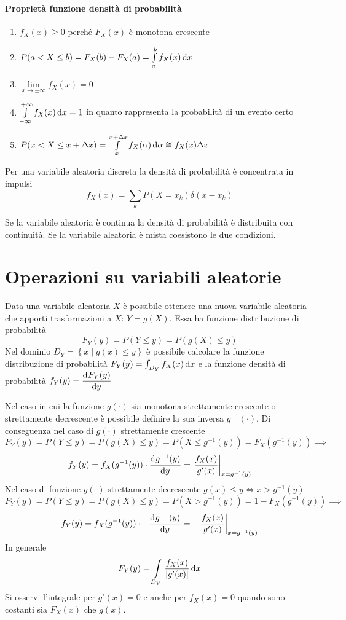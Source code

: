 \paragraph{Proprietà funzione densità di probabilità}
\begin{enumerate}
\item $f_X(x)\geq 0$ perché $F_X(x)$ è monotona crescente
\item $P(a<X\leq b)=F_X(b)-F_X(a)=\int\limits_{a}^{b}{f_X(x)}{\,\mathop{}\!\mathrm{d}{x}}$
\item $\lim\limits_{x\to\pm\infty}f_X(x)=0$
\item $\int\limits_{-\infty}^{+\infty}{f_X(x)}{\,\mathop{}\!\mathrm{d}{x}}=1$ in quanto rappresenta la probabilità di un evento certo
\item $P(x<X\leq x+\Delta x)=\int\limits_{x}^{x+\Delta x}{f_X(\alpha)}{\,\mathop{}\!\mathrm{d}{\alpha}}\cong f_X(x)\Delta x$
\end{enumerate}

Per una variabile aleatoria discreta la densità di probabilità è concentrata in impulsi
\begin{equation}
	f_X(x)=\sum_k P(X=x_k) \delta(x-x_k)
\end{equation}

Se la variabile aleatoria è continua la densità di probabilità è distribuita con continuità.
Se la variabile aleatoria è mista coesistono le due condizioni.

\section{Operazioni su variabili aleatorie}
Data una variabile aleatoria $X$ è possibile ottenere una nuova variabile aleatoria che apporti trasformazioni a $X$: $Y=g(X)$. Essa ha funzione distribuzione di probabilità
\begin{equation}
	F_Y(y)=P(Y\leq y)=P(g(X)\leq y)
\end{equation}
Nel dominio $D_Y=\left\lbrace x\mid g(x)\leq y\right\rbrace$ è possibile calcolare la funzione distribuzione di probabilità $F_Y(y)=\int_{D_Y}{f_X(x)\mathop{}\!\mathrm{d} x}$ e la funzione densità di probabilità $f_Y(y)=\dfrac{\mathop{}\!\mathrm{d}^{}F_Y(y)}{\mathop{}\!\mathrm{d} y^{}}$

Nel caso in cui la funzione $g(\cdot)$ sia monotona strettamente crescente o strettamente decrescente è possibile definire la sua inversa $g^{-1}(\cdot)$. Di conseguenza nel caso di $g(\cdot)$ strettamente crescente
\[
	F_Y(y)=P(Y\leq y)=P(g(X)\leq y)=P(X\leq g^{-1}(y))=F_X(g^{-1}(y))\implies
\]
\begin{equation}
	f_Y(y)=f_X(g^{-1}(y))\cdot\dfrac{\mathop{}\!\mathrm{d}^{}g^{-1}(y)}{\mathop{}\!\mathrm{d} y^{}}=\left.{\frac{f_X(x)}{g'(x)}}\right\rvert_{x=g^{-1}(y)}
\end{equation}
Nel caso di funzione $g(\cdot)$ strettamente decrescente $g(x)\leq y\iff x>g^{-1}(y)$
\[F_Y(y)=P(Y\leq y)=P(g(X)\leq y)=P(X>g^{-1}(y))=1-F_X(g^{-1}(y))\implies
\]
\begin{equation}
	f_Y(y)=f_X(g^{-1}(y))\cdot-\dfrac{\mathop{}\!\mathrm{d}^{}g^{-1}(y)}{\mathop{}\!\mathrm{d} y^{}}=\left.{-\frac{f_X(x)}{g'(x)}}\right\rvert_{x=g^{-1}(y)}
\end{equation}
In generale
\begin{equation}
	F_Y(y)=\int\limits_{D_Y}{\frac{f_X(x)}{\left|{g'(x)}\right|}\mathop{}\!\mathrm{d} x}
\end{equation}
Si osservi l'integrale per $g'(x)=0$ e anche per $f_X(x)=0$ quando sono costanti sia $F_X(x)$ che $g(x)$.

